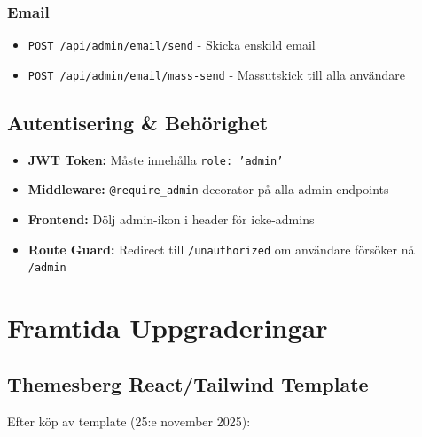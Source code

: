 \documentclass[12pt,a4paper]{article}
\begin{document}
\subsubsection{Email}
\begin{itemize}
  \item \texttt{POST /api/admin/email/send} - Skicka enskild email
  \item \texttt{POST /api/admin/email/mass-send} - Massutskick till alla användare
\end{itemize}

\subsection{Autentisering \& Behörighet}
\begin{itemize}
  \item \textbf{JWT Token:} Måste innehålla \texttt{role: 'admin'}
  \item \textbf{Middleware:} \texttt{@require\_admin} decorator på alla admin-endpoints
  \item \textbf{Frontend:} Dölj admin-ikon i header för icke-admins
  \item \textbf{Route Guard:} Redirect till \texttt{/unauthorized} om användare försöker nå \texttt{/admin}
\end{itemize}

\section{Framtida Uppgraderingar}

\subsection{Themesberg React/Tailwind Template}
Efter köp av template (25:e november 2025):
\end{document}
